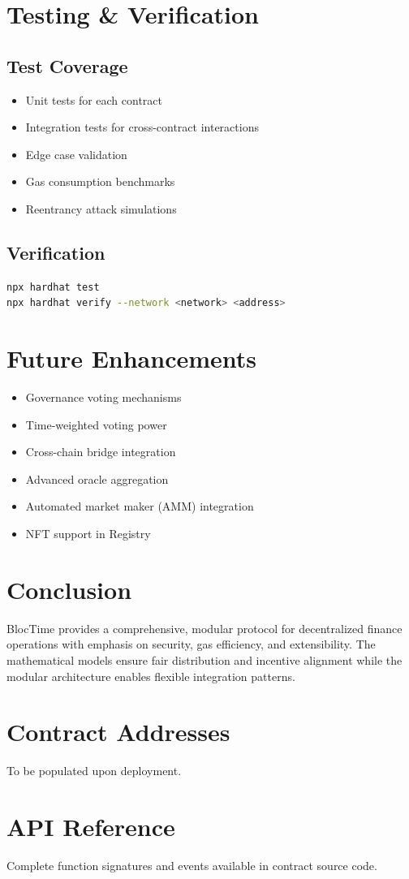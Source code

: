 \documentclass[11pt,a4paper]{article}
\begin{document}
\section{Testing \& Verification}

\subsection{Test Coverage}
\begin{itemize}
\item Unit tests for each contract
\item Integration tests for cross-contract interactions
\item Edge case validation
\item Gas consumption benchmarks
\item Reentrancy attack simulations
\end{itemize}

\subsection{Verification}
\begin{lstlisting}[language=bash]
npx hardhat test
npx hardhat verify --network <network> <address>
\end{lstlisting}

\section{Future Enhancements}

\begin{itemize}
\item Governance voting mechanisms
\item Time-weighted voting power
\item Cross-chain bridge integration
\item Advanced oracle aggregation
\item Automated market maker (AMM) integration
\item NFT support in Registry
\end{itemize}

\section{Conclusion}

BlocTime provides a comprehensive, modular protocol for decentralized finance operations with emphasis on security, gas efficiency, and extensibility. The mathematical models ensure fair distribution and incentive alignment while the modular architecture enables flexible integration patterns.

\appendix

\section{Contract Addresses}

To be populated upon deployment.

\section{API Reference}

Complete function signatures and events available in contract source code.
\end{document}
